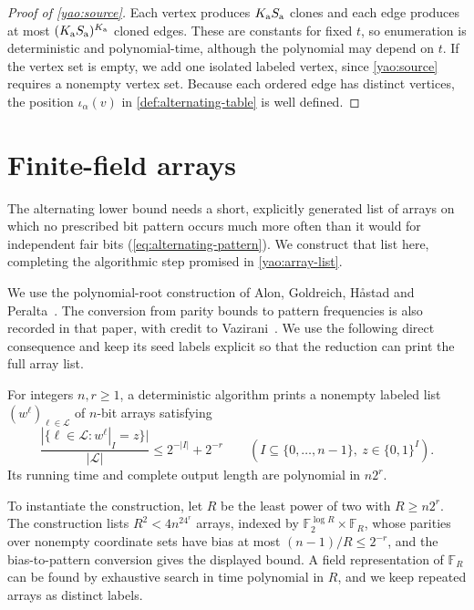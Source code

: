 \documentclass[11pt,letterpaper]{article} \usepackage[utf8]{inputenc}
\theoremstyle{plain} \newtheorem{theorem}{Theorem}[section]
\theoremstyle{definition} \newaliascnt{definition}{theorem}
\begin{document}
\begin{proof}[Proof of \cref{yao:source}]
Each vertex produces $K_{\rm a}S_{\rm a}$ clones and each edge produces at
most $(K_{\rm a}S_{\rm a})^{K_{\rm a}}$ cloned edges. These are constants for fixed
$t$, so enumeration is deterministic and polynomial-time, although the
polynomial may depend on $t$. If the vertex set is empty, we add one isolated labeled
vertex, since \cref{yao:source} requires a nonempty vertex set. Because each
ordered edge has distinct vertices, the position $\iota_\alpha(v)$ in
\cref{def:alternating-table} is well defined.
\end{proof}

\section{Finite-field arrays}\label{sec:arrays}
\label{sec:alternating_implementation}

The alternating lower bound needs a short, explicitly generated list of
arrays on which no prescribed bit pattern occurs much more often than it
would for independent fair bits (\cref{eq:alternating-pattern}). We construct that list here, completing
the algorithmic step promised in \cref{yao:array-list}.

We use the polynomial-root construction of Alon, Goldreich,
H{\aa}stad and Peralta~\cite[Construction~3 and Proposition~3]{alon1992smallbias}.
The conversion from parity bounds to pattern frequencies is also recorded
in that paper, with credit to Vazirani~\cite[Lemma~1 and Corollary~1]{alon1992smallbias}.
We use the following direct consequence and keep its seed labels explicit
so that the reduction can print the full array list.

\begin{lemma}\label{yao:finite-field-list}
For integers $n,r\ge1$, a deterministic algorithm prints a nonempty labeled
list $(w^\ell)_{\ell\in\mathcal L}$ of $n$-bit arrays satisfying
\[
\frac{|\{\ell\in\mathcal L:w^\ell|_I=z\}|}{|\mathcal L|}
\le2^{-|I|}+2^{-r}
\qquad(I\subseteq\{0,\ldots,n-1\},\ z\in\{0,1\}^I).
\]
Its running time and complete output length are polynomial in $n2^r$.
\end{lemma}

To instantiate the construction, let $R$ be the least power of two with
$R\ge n2^r$. The construction lists $R^2<4n^24^r$ arrays, indexed by
$\mathbb F_2^{\log R}\times\mathbb F_R$, whose parities over nonempty coordinate sets have bias at most
$(n-1)/R\le2^{-r}$, and the bias-to-pattern conversion gives the displayed bound.
A field representation of $\mathbb F_R$ can be found by exhaustive search in time
polynomial in $R$, and we keep repeated arrays as distinct labels.
\end{document}

